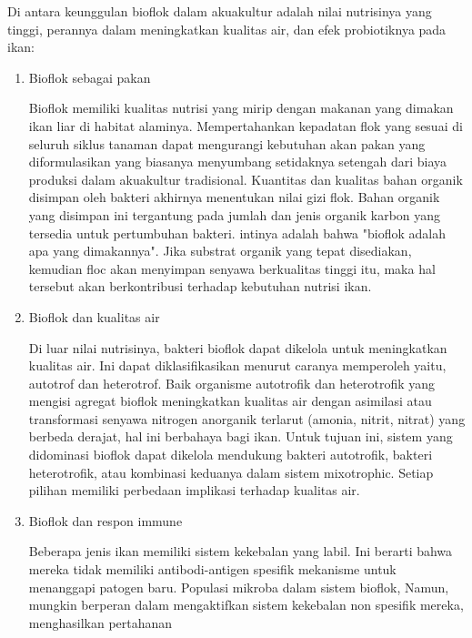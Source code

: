 Di antara keunggulan bioflok dalam akuakultur adalah nilai nutrisinya yang tinggi, perannya dalam meningkatkan kualitas air, dan efek probiotiknya pada ikan:
\begin{enumerate}
	\item Bioflok sebagai pakan

	Bioflok memiliki kualitas nutrisi yang mirip dengan makanan yang dimakan ikan liar di habitat alaminya. Mempertahankan kepadatan flok yang sesuai di seluruh siklus tanaman dapat mengurangi kebutuhan akan pakan yang diformulasikan \citep{avnimelech2009} yang biasanya menyumbang setidaknya setengah dari biaya produksi dalam akuakultur tradisional. Kuantitas dan kualitas bahan organik disimpan oleh bakteri akhirnya menentukan nilai gizi flok. Bahan organik yang disimpan ini tergantung pada jumlah dan jenis organik karbon yang tersedia untuk pertumbuhan bakteri. intinya adalah bahwa "bioflok adalah apa yang dimakannya". Jika substrat organik yang tepat disediakan, kemudian floc akan menyimpan senyawa berkualitas tinggi itu, maka hal tersebut akan berkontribusi terhadap kebutuhan nutrisi ikan.

	\item Bioflok dan kualitas air

	Di luar nilai nutrisinya, bakteri bioflok dapat dikelola untuk meningkatkan kualitas air. Ini dapat diklasifikasikan menurut caranya memperoleh yaitu, autotrof dan heterotrof. Baik organisme autotrofik dan heterotrofik yang mengisi agregat bioflok meningkatkan kualitas air dengan asimilasi atau transformasi senyawa nitrogen anorganik terlarut (amonia, nitrit, nitrat) yang berbeda derajat, hal ini berbahaya bagi ikan. Untuk tujuan ini, sistem yang didominasi bioflok dapat dikelola mendukung bakteri autotrofik, bakteri heterotrofik, atau kombinasi keduanya dalam sistem mixotrophic. Setiap pilihan memiliki perbedaan implikasi terhadap kualitas air.

	\item Bioflok dan respon immune

	Beberapa jenis ikan memiliki sistem kekebalan yang labil. Ini berarti bahwa mereka tidak memiliki antibodi-antigen spesifik mekanisme untuk menanggapi patogen baru. Populasi mikroba dalam sistem bioflok, Namun, mungkin berperan dalam mengaktifkan sistem kekebalan non spesifik mereka, menghasilkan pertahanan
\end{enumerate}

